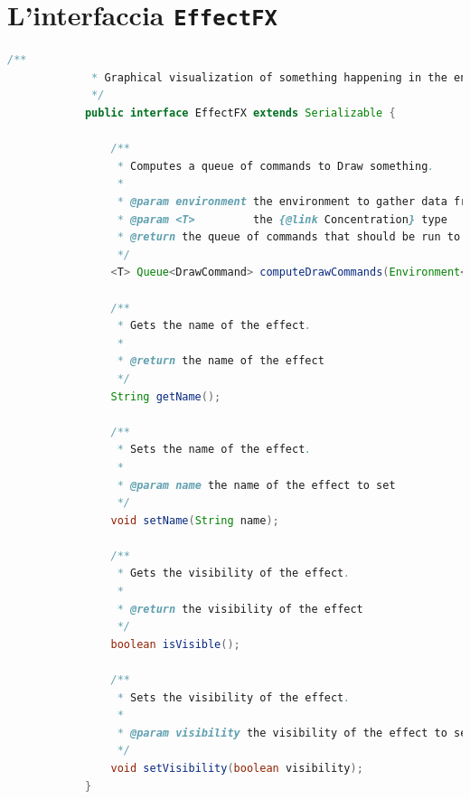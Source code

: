     \section{L'interfaccia \texttt{EffectFX}}\label{appendix:effectfx}
        \begin{lstlisting}[language=Java]
            /**
             * Graphical visualization of something happening in the environment.
             */
            public interface EffectFX extends Serializable {

                /**
                 * Computes a queue of commands to Draw something.
                 *
                 * @param environment the environment to gather data from
                 * @param <T>         the {@link Concentration} type
                 * @return the queue of commands that should be run to draw the effect
                 */
                <T> Queue<DrawCommand> computeDrawCommands(Environment<T> environment);

                /**
                 * Gets the name of the effect.
                 *
                 * @return the name of the effect
                 */
                String getName();

                /**
                 * Sets the name of the effect.
                 *
                 * @param name the name of the effect to set
                 */
                void setName(String name);

                /**
                 * Gets the visibility of the effect.
                 *
                 * @return the visibility of the effect
                 */
                boolean isVisible();

                /**
                 * Sets the visibility of the effect.
                 *
                 * @param visibility the visibility of the effect to set
                 */
                void setVisibility(boolean visibility);
            }
        \end{lstlisting}

